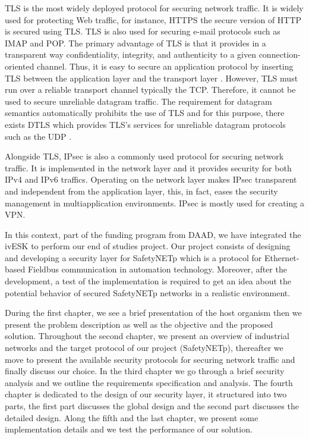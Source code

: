 \ac{TLS} is the most widely deployed protocol for securing network traffic. It is widely used for
protecting Web traffic, for instance, \ac{HTTPS} the secure version of \ac{HTTP} is secured using \ac{TLS}. \ac{TLS} is also
used for securing e-mail protocols such as \ac{IMAP} and \ac{POP}. The primary advantage of \ac{TLS} is
that it provides in a transparent way confidentiality, integrity, and authenticity to a given connection-oriented channel. Thus, it is
easy to secure an application protocol by inserting \ac{TLS} between the application layer and the transport
layer \cite{rfc5246}. However, \ac{TLS} must run over a reliable transport channel typically the \ac{TCP}. Therefore, it cannot be
used to secure unreliable datagram traffic. The requirement for datagram semantics automatically prohibits the
use of \ac{TLS} and for this purpose, there exists \ac{DTLS} which provides \ac{TLS}'s services for unreliable datagram
protocols such as the \ac{UDP} \cite{rfc6347}.

Alongside \ac{TLS}, \ac{IPsec} is also a commonly used protocol for securing network traffic. It is implemented
in the network layer and it provides security for both IPv4 and IPv6 traffics. Operating on the network layer
makes \ac{IPsec} transparent and independent from the application layer, this, in fact, eases the security
management in multiapplication environments. \ac{IPsec} is mostly used for creating a \ac{VPN}.

In this context, part of the funding program from \ac{DAAD}, we have integrated the \ac{ivESK} to perform our end of studies project.
Our project consists of designing and developing a security layer for SafetyNETp which is a protocol for Ethernet-based Fieldbus communication
in automation technology. Moreover, after the development, a test of the implementation is required to get an idea about
the potential behavior of secured SafetyNETp networks in a realistic environment.

During the first chapter, we see a brief presentation of the host organism then we present the
problem description as well as the objective and the proposed solution. Throughout the second chapter, we present an overview of industrial networks and the target protocol of our project (SafetyNETp),
thereafter we move to present the available security protocols for securing network traffic and finally discuss our choice.
In the third chapter we go through a brief security analysis and we outline the requirements specification and analysis.
The fourth chapter is dedicated to the design of our security layer, it structured into two parts, the first part
discusses the global design and the second part discusses the detailed design.
Along the fifth and the last chapter, we present some implementation details and we test the performance of
our solution.

